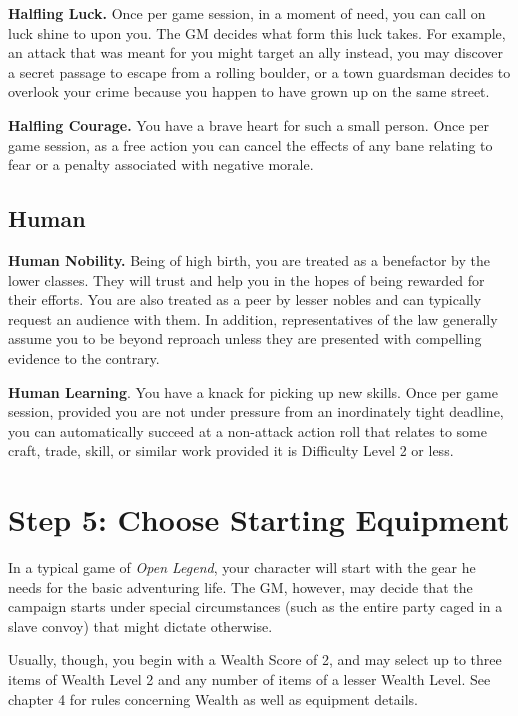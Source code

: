 \documentclass[12pt]{report}
\begin{document}
\textbf{Halfling Luck.} Once per game session, in a moment of need, you
can call on luck shine to upon you. The GM decides what form this luck
takes. For example, an attack that was meant for you might target an
ally instead, you may discover a secret passage to escape from a rolling
boulder, or a town guardsman decides to overlook your crime because you
happen to have grown up on the same street.

\textbf{Halfling Courage.} You have a brave heart for such a small
person. Once per game session, as a free action you can cancel the
effects of any bane relating to fear or a penalty associated with
negative morale.

\subsection{Human}\label{human}

\textbf{Human Nobility.} Being of high birth, you are treated as a
benefactor by the lower classes. They will trust and help you in the
hopes of being rewarded for their efforts. You are also treated as a
peer by lesser nobles and can typically request an audience with them.
In addition, representatives of the law generally assume you to be
beyond reproach unless they are presented with compelling evidence to
the contrary.

\textbf{Human Learning}. You have a knack for picking up new skills.
Once per game session, provided you are not under pressure from an
inordinately tight deadline, you can automatically succeed at a
non-attack action roll that relates to some craft, trade, skill, or
similar work provided it is Difficulty Level 2 or less.

\section{Step 5: Choose Starting
Equipment}\label{step-5-choose-starting-equipment}

In a typical game of \emph{Open Legend}, your character will start with
the gear he needs for the basic adventuring life. The GM, however, may
decide that the campaign starts under special circumstances (such as the
entire party caged in a slave convoy) that might dictate otherwise.

Usually, though, you begin with a Wealth Score of 2, and may select up
to three items of Wealth Level 2 and any number of items of a lesser
Wealth Level. See chapter 4 for rules concerning Wealth as well as
equipment details.
\end{document}
